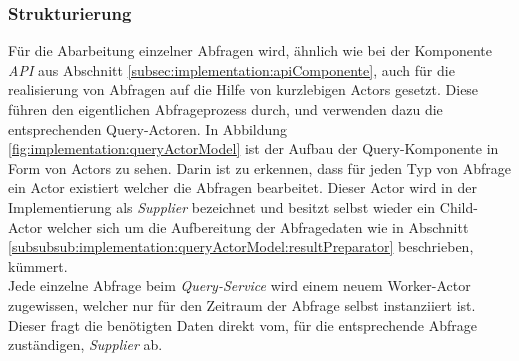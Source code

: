 \subsubsection{Strukturierung}
Für die Abarbeitung einzelner Abfragen wird, ähnlich wie bei der Komponente \textit{API} aus Abschnitt \ref{subsec:implementation:apiComponente}, auch für die realisierung von Abfragen auf die Hilfe von kurzlebigen Actors gesetzt. Diese führen den eigentlichen Abfrageprozess durch, und verwenden dazu die entsprechenden Query-Actoren. In Abbildung \ref{fig:implementation:queryActorModel} ist der Aufbau der Query-Komponente in Form von Actors zu sehen. Darin ist zu erkennen, dass für jeden Typ von Abfrage ein Actor existiert welcher die Abfragen bearbeitet. 
Dieser Actor wird in der Implementierung als \textit{Supplier} bezeichnet und besitzt selbst wieder ein Child-Actor welcher sich um die Aufbereitung der Abfragedaten wie in Abschnitt \ref{subsubsub:implementation:queryActorModel:resultPreparator} beschrieben, kümmert. \\
Jede einzelne Abfrage beim \textit{Query-Service} wird einem neuem Worker-Actor zugewissen, welcher nur für den Zeitraum der Abfrage selbst instanziiert ist. Dieser fragt die benötigten Daten direkt vom, für die entsprechende Abfrage zuständigen, \textit{Supplier} ab. 













